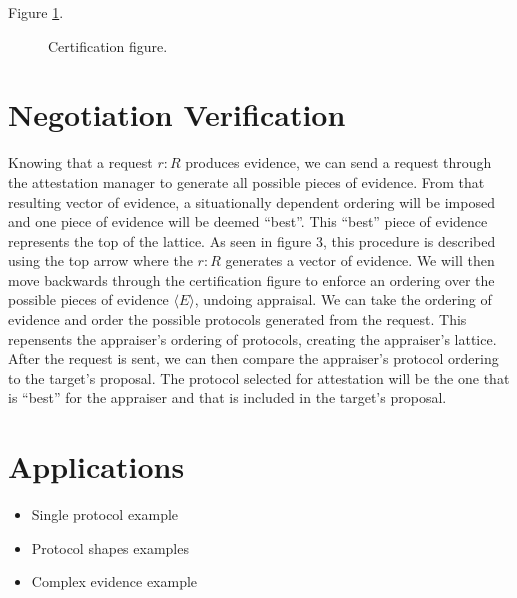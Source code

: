 \documentclass[sigconf,authordraft]{acmart}
\begin{document}
Figure \ref{fig:certification-fig}.

\begin{figure}[hbtp]
  \centering 
  \caption[Attestation process]{Certification figure.}
  \label{fig:certification-fig}
\end{figure}


\section{Negotiation Verification}

Knowing that a request $r:R$ produces evidence, we can send a request
through the attestation manager to generate all possible pieces of
evidence. From that resulting vector of evidence, a situationally
dependent ordering will be imposed and one piece of evidence will be
deemed ``best''. This ``best'' piece of evidence represents the top of
the lattice. As seen in figure 3, this procedure is described using
the top arrow where the $r:R$ generates a vector of evidence. We will
then move backwards through the certification figure to enforce an
ordering over the possible pieces of evidence $\langle E \rangle$,
undoing appraisal. We can take the ordering of evidence and order the
possible protocols generated from the request. This repensents the
appraiser's ordering of protocols, creating the appraiser's
lattice. After the request is sent, we can then compare the
appraiser's protocol ordering to the target's proposal. The protocol
selected for attestation will be the one that is ``best'' for the
appraiser and that is included in the target's proposal.

\section{Applications}

\begin{itemize}
\item Single protocol example
\item Protocol shapes examples
\item Complex evidence example

\end{itemize}
\end{document}
